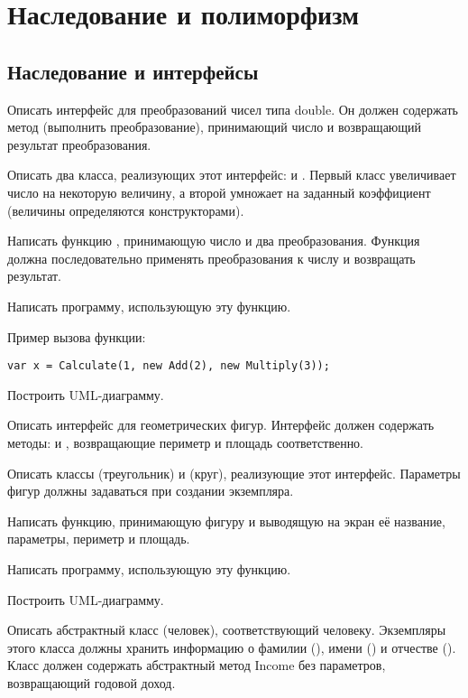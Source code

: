 \section{Наследование и полиморфизм}

\subsection{Наследование и интерфейсы}

\task Описать интерфейс  для преобразований чисел
типа double. Он должен содержать метод  (выполнить
преобразование), принимающий число и возвращающий результат
преобразования.

Описать два класса, реализующих этот интерфейс:  и
. Первый класс увеличивает число на некоторую величину,
а второй умножает на заданный коэффициент (величины определяются
конструкторами).

Написать функцию , принимающую число и два
преобразования. Функция должна последовательно применять
преобразования к числу и возвращать результат.

Написать программу, использующую эту функцию.

Пример вызова функции:
\begin{lstlisting}[numbers=none]
var x = Calculate(1, new Add(2), new Multiply(3));
\end{lstlisting}

Построить UML-диаграмму.

\task Описать интерфейс  для геометрических
фигур. Интерфейс должен содержать методы:  и
, возвращающие периметр и площадь соответственно.

Описать классы  (треугольник) и  (круг),
реализующие этот интерфейс. Параметры фигур должны задаваться при
создании экземпляра.

Написать функцию, принимающую фигуру и выводящую на экран её название,
параметры, периметр и площадь.

Написать программу, использующую эту функцию.

Построить UML-диаграмму.

\task Описать абстрактный класс  (человек),
соответствующий человеку. Экземпляры этого класса должны хранить
информацию о фамилии (), имени () и отчестве
(). Класс должен содержать абстрактный метод Income
без параметров, возвращающий годовой доход.

